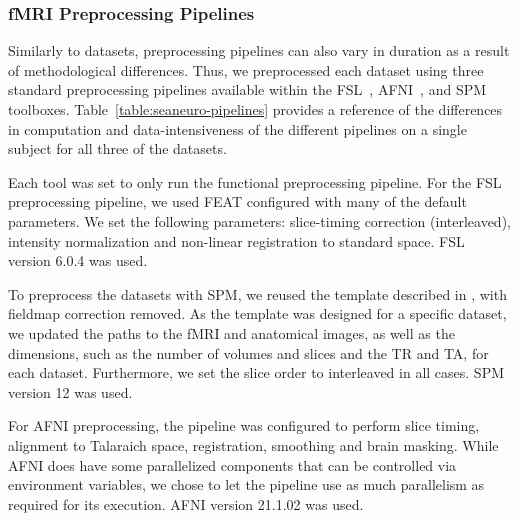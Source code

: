 \documentclass[fleqn,10pt]{wlscirep}
\begin{document}
    
    \subsubsection{fMRI Preprocessing Pipelines}
    
    Similarly to datasets, preprocessing pipelines can also vary in duration as
    a result of methodological differences. Thus, we preprocessed each dataset
    using three standard preprocessing pipelines available within the FSL~\cite{fsl},
    AFNI~\cite{cox1996afni}, and SPM~\cite{spm} toolboxes.
    Table~\ref{table:seaneuro-pipelines} provides a reference of the differences
    in computation and data-intensiveness of the different pipelines on a single
    subject for all three of the datasets.
    
    Each tool was set to only run the functional preprocessing pipeline. For the FSL preprocessing pipeline, 
    we used FEAT configured with many of
    the default parameters. We set the following parameters: slice-timing
    correction (interleaved), intensity normalization and non-linear
    registration to standard space. FSL version 6.0.4 was used.
    
    To preprocess the datasets with SPM, we reused the template described in
    \cite{haitas2021age}, with fieldmap correction removed. As the template was
    designed for a specific dataset, we updated the paths to the fMRI and
    anatomical images, as well as the dimensions, such as the number of volumes
    and slices and the TR and TA, for each dataset. Furthermore, we set the
    slice order to interleaved in all cases. SPM version 12 was used.
    
    For AFNI preprocessing, the pipeline was configured to perform slice timing,
    alignment to Talaraich space, registration, smoothing and brain masking.
    While AFNI does have some parallelized components that can be controlled via
    environment variables, we chose to let the pipeline use as much parallelism
    as required for its execution. AFNI version 21.1.02 was used.

    
\end{document}
